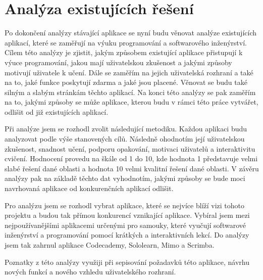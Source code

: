 \section{Analýza existujících řešení}

Po dokončení analýzy stávající aplikace se nyní budu věnovat analýze existujících aplikací, které se zaměřují na výuku programování a softwarového inženýrství. Cílem této analýzy je zjistit, jakým způsobem existující aplikace přistupují k výuce programování, jakou mají uživatelskou zkušenost a jakými způsoby motivují uživatele k učení. Dále se zaměřím na jejich uživatelská rozhraní a také na to, jaké funkce poskytují zdarma a jaké jsou placené. Věnovat se budu také silným a slabým stránkám těchto aplikací. Na konci této analýzy se pak zaměřím na to, jakými způsoby se může aplikace, kterou budu v rámci této práce vytvářet, odlišit od již existujících aplikací.

Při analýze jsem se rozhodl zvolit následující metodiku. Každou aplikaci budu analyzovat podle výše stanovených cílů. Následně ohodnotím její uživatelskou zkušenost, snadnost učení, podporu opakování, motivaci uživatelů a interaktivitu cvičení. Hodnocení provedu na škále od 1 do 10, kde hodnota 1 představuje velmi slabé řešení dané oblasti a hodnota 10 velmi kvalitní řešení dané oblasti. V závěru analýzy pak na základě těchto dat vyhodnotím, jakými způsoby se bude moci navrhovaná aplikace od konkurenčních aplikací odlišit.

Pro analýzu jsem se rozhodl vybrat aplikace, které se nejvíce blíží vizi tohoto projektu a budou tak přímou konkurencí vznikající aplikace. Vybíral jsem mezi nejpoužívanějšími aplikacemi určenými pro samouky, které vyučují softwarové inženýrství a programování pomocí krátkých a interaktivních lekcí. Do analýzy jsem tak zahrnul aplikace Codecademy, Sololearn, Mimo a Scrimba.

Poznatky z této analýzy využiji při sepisování požadavků této aplikace, návrhu nových funkcí a nového vzhledu uživatelského rozhraní.

